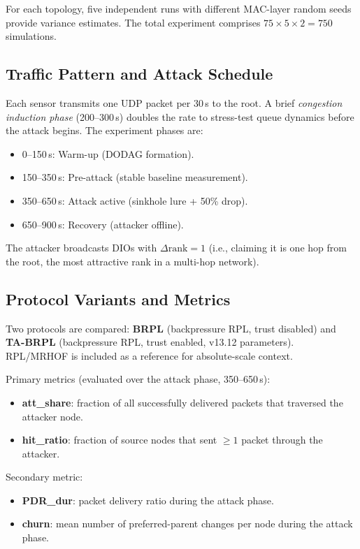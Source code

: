 \documentclass[conference]{IEEEtran}
\begin{document}
For each topology, five independent runs with different MAC-layer random seeds
provide variance estimates.
The total experiment comprises $75 \times 5 \times 2 = 750$ simulations.

\subsection{Traffic Pattern and Attack Schedule}
\label{sec:traffic}

Each sensor transmits one UDP packet per 30\,s to the root.
A brief \emph{congestion induction phase} (200--300\,s) doubles
the rate to stress-test queue dynamics before the attack begins.
The experiment phases are:
\begin{itemize}
  \item 0--150\,s: Warm-up (DODAG formation).
  \item 150--350\,s: Pre-attack (stable baseline measurement).
  \item 350--650\,s: Attack active (sinkhole lure + 50\% drop).
  \item 650--900\,s: Recovery (attacker offline).
\end{itemize}
The attacker broadcasts DIOs with $\Delta\text{rank} = 1$
(i.e., claiming it is one hop from the root, the most attractive
rank in a multi-hop network).

\subsection{Protocol Variants and Metrics}
\label{sec:protocols}

Two protocols are compared:
\textbf{BRPL} (backpressure RPL, trust disabled) and
\textbf{TA-BRPL} (backpressure RPL, trust enabled, v13.12 parameters).
RPL/MRHOF is included as a reference for absolute-scale context.

Primary metrics (evaluated over the attack phase, 350--650\,s):
\begin{itemize}
  \item \textbf{att\_share}: fraction of all successfully delivered packets
    that traversed the attacker node.
  \item \textbf{hit\_ratio}: fraction of source nodes that sent $\geq 1$
    packet through the attacker.
\end{itemize}
Secondary metric:
\begin{itemize}
  \item \textbf{PDR\_dur}: packet delivery ratio during the attack phase.
  \item \textbf{churn}: mean number of preferred-parent changes per node
    during the attack phase.
\end{itemize}
\end{document}
